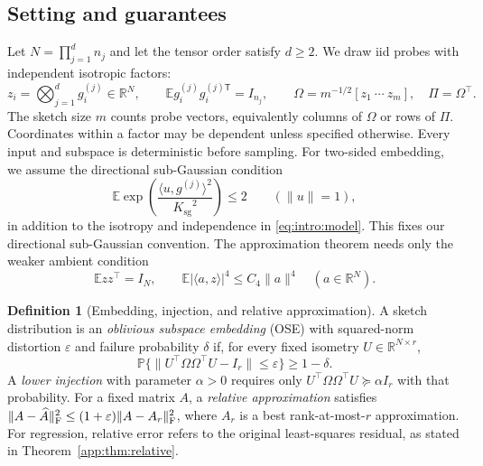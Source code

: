 \documentclass[11pt,a4paper]{article}
\theoremstyle{definition}\newtheorem{definition}[theorem]{Definition}
\theoremstyle{remark}\newtheorem{remark}[theorem]{Remark}
\numberwithin{equation}{section}
\newcommand{\R}{\mathbb R}\newcommand{\E}{\mathbb E}\newcommand{\Pp}{\mathbb P}
\newcommand{\Ksg}{{K_{\mathrm{sg}}}}\newcommand{\Cfour}{{C_4}}
\newcommand{\norm}[1]{\lVert#1\rVert}\newcommand{\ip}[2]{\langle#1,#2\rangle}
\begin{document}
\subsection{Setting and guarantees}\label{sec:setting}
Let $N=\prod_{j=1}^d n_j$ and let the tensor order satisfy $d\ge2$.
We draw iid probes with independent isotropic factors:
\begin{equation}\label{eq:intro:model}
 z_i=\bigotimes_{j=1}^d g_i^{(j)}\in\R^N,
 \qquad\E g_i^{(j)}g_i^{(j)\mathsf T}=I_{n_j},\qquad
 \Omega=m^{-1/2}[z_1\ \cdots\ z_m],\quad\Pi=\Omega^\top.
\end{equation}
The sketch size $m$ counts probe vectors, equivalently columns of
$\Omega$ or rows of $\Pi$. Coordinates within a factor may be dependent
unless specified otherwise. Every input and subspace is deterministic
before sampling. For two-sided embedding, we assume the directional
sub-Gaussian condition
\begin{equation}\label{core:eq:model}
 \E\exp\!\left(\frac{\ip{u}{g^{(j)}}^2}{\Ksg^2}\right)\le2
 \qquad(\norm u=1),
\end{equation}
in addition to the isotropy and independence in \eqref{eq:intro:model}.
This fixes our directional sub-Gaussian convention.
The approximation theorem needs only the weaker ambient condition
\begin{equation}\label{app:eq:fourth}
 \E zz^\top=I_N,\qquad
 \E|\ip a z|^4\le\Cfour\norm a^4\quad(a\in\R^N).
\end{equation}

\begin{definition}[Embedding, injection, and relative approximation]
\label{def:guarantees}
A sketch distribution is an \emph{oblivious subspace embedding} (OSE)
with squared-norm distortion $\varepsilon$ and failure probability
$\delta$ if, for every fixed isometry $U\in\R^{N\times r}$,
\begin{equation}\label{eq:intro:ose}
 \Pp\{\norm{U^\top\Omega\Omega^\top U-I_r}\le\varepsilon\}
 \ge1-\delta.
\end{equation}
A \emph{lower injection} with parameter $\alpha>0$ requires only
$U^\top\Omega\Omega^\top U\succeq\alpha I_r$ with that probability.
For a fixed matrix $A$, a \emph{relative approximation} satisfies
$\norm{A-\widehat A}_{\F}^2\le(1+\varepsilon)\norm{A-A_r}_{\F}^2$,
where $A_r$ is a best rank-at-most-$r$ approximation.
For regression, relative error refers to the original least-squares
residual, as stated in Theorem~\ref{app:thm:relative}.
\end{definition}
\end{document}
